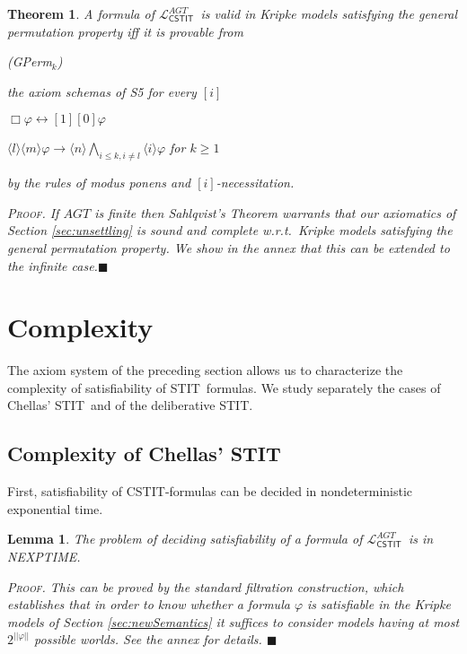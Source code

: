 \documentclass{article}
\newtheorem{theorem}{Theorem}
\newtheorem{lemma}{Lemma}
\newenvironment{pf}{\em \medskip\noindent \textsc{Proof.}}
{\hspace*{\fill}\nolinebreak[2]\hspace*{\fill}$\blacksquare$\medskip}
\renewcommand{\phi}{\varphi}
\newcommand{\eqv}{\leftrightarrow}      \newcommand{\imp}{\rightarrow}          \newcommand{\subfml}{\mathit{sf}}
\newcommand{\lngth}[1]{|\!|#1|\!|}
\newcommand{\cstit}[1]{[{#1}]}           \newcommand{\poscstit}[1]{\langle {#1} \rangle}    \newcommand{\dstit}[2]{[{#1}\ \mathit{dstit}\! :{#2}]}
\newcommand{\agtset}{\ensuremath{\mathit{AGT}}}
\newcommand{\STIT} {{\textsf{STIT}}}              \newcommand{\CSTIT}{{\textsf{CSTIT}}}            \newcommand{\DSTIT}{{\textsf{DSTIT}}}
\newcommand{\LCSTIT}{$\mathcal{L}_{\mathsf{CSTIT}}^\agtset$}
\begin{document}
\begin{theorem}\label{theo:Sahlqvist}
A formula of \LCSTIT\ is valid in Kripke models satisfying the general permutation property
iff it is provable from
\begin{itemlist}{(GPerm$_k$)}
\item[S5($i$)]     the axiom schemas of S5 for every $\cstit{i}$
\item[Def($\Box$)] $\Box \phi \eqv \cstit{1} \cstit{0} \phi $
\item[(GPerm$_k$)] $\poscstit{l}\poscstit{m}\phi \imp
                    \poscstit{n}\bigwedge_{i\leq k, i \not = l} \poscstit{i}\phi$
                    \hfill for $k \geq 1$
\end{itemlist}
by the rules of modus ponens and $\cstit{i}$-necessitation.

\begin{pf}
If $\agtset $ is finite then
Sahlqvist's Theorem warrants that our axiomatics of Section \ref{sec:unsettling}
is sound and complete w.r.t.\ Kripke models satisfying the general permutation property.
We show in the annex that this can be extended to the infinite case.\end{pf}
\end{theorem}





\goodbreak
\section{Complexity}\label{sec:complexity}


The axiom system of the preceding section allows us to characterize the complexity
of satisfiability of \STIT\ formulas.
We study separately the cases of Chellas' \STIT\ and of the 
deliberative \STIT.

\subsection{Complexity of Chellas' \STIT}

First, satisfiability of \CSTIT-formulas
can be decided in nondeterministic exponential time.

\begin{lemma}\label{lem:ComplexCstitUpper}
The problem of deciding satisfiability of a formula of \LCSTIT\ 
is in NEXPTIME.

\begin{pf}
This can be proved by the standard filtration construction,
which establishes that in order to know whether a formula $\phi$
is satisfiable in the Kripke models of Section \ref{sec:newSemantics}
it suffices to consider models having at most $2^{\lngth{\phi}} $ possible worlds.
See the annex for details.
\end{pf}

\end{lemma}
\end{document}
